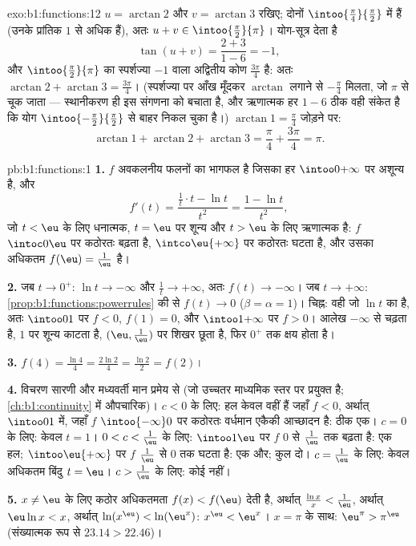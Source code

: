 \begin{solution}{exo:b1:functions:12}
$u = \arctan 2$ और $v = \arctan 3$ रखिए; दोनों
$\intoo{\frac\pi4}{\frac\pi2}$ में हैं (उनके प्रांतिक $1$ से अधिक हैं), अतः
$u + v \in \intoo{\frac\pi2}{\pi}$। योग-सूत्र देता है
\[
\tan(u + v) = \frac{2 + 3}{1 - 6} = -1 ,
\]
और $\intoo{\frac\pi2}{\pi}$ का स्पर्शज्या $-1$ वाला अद्वितीय कोण
$\frac{3\pi}4$ है: अतः $\arctan 2 + \arctan 3 = \frac{3\pi}4$। (स्पर्शज्या
पर आँख मूँदकर $\arctan$ लगाने से $-\frac\pi4$ मिलता, जो $\pi$ से चूक जाता
--- स्थानीकरण ही इस संगणना को बचाता है, और ऋणात्मक हर $1 - 6$ ठीक वही संकेत
है कि योग $\intoo{-\frac\pi2}{\frac\pi2}$ से बाहर निकल चुका है।) $\arctan 1
= \frac\pi4$ जोड़ने पर:
\[
\arctan 1 + \arctan 2 + \arctan 3 = \frac\pi4 + \frac{3\pi}4 = \pi .
\]
\end{solution}

\begin{solution}{pb:b1:functions:1}
\textbf{1.} $f$ अवकलनीय फलनों का भागफल है जिसका हर $\intoo0{+\infty}$ पर
अशून्य है, और
\[
f'(t) = \frac{\frac1t \cdot t - \ln t}{t^2} = \frac{1 - \ln
t}{t^2} ,
\]
जो $t < \eu$ के लिए धनात्मक, $t = \eu$ पर शून्य और $t > \eu$ के लिए ऋणात्मक
है: $f$ $\intoc0\eu$ पर कठोरतः बढ़ता है, $\intco\eu{+\infty}$ पर कठोरतः घटता
है, और उसका अधिकतम $f(\eu) = \frac1\eu$ है।

\textbf{2.} जब $t \to 0^+$: $\ln t \to -\infty$ और $\frac1t \to +\infty$,
अतः $f(t) \to -\infty$। जब $t \to +\infty$:
\cref{prop:b1:functions:powerrules} की  से $f(t) \to 0$ ($\beta
= \alpha = 1$)। चिह्न: वही जो $\ln t$ का है, अतः $\intoo01$ पर $f < 0$,
$f(1) = 0$, और $\intoo1{+\infty}$ पर $f > 0$। आलेख $-\infty$ से चढ़ता है,
$1$ पर शून्य काटता है, $(\eu, \frac1\eu)$ पर शिखर छूता है, फिर $0^+$ तक क्षय
होता है।

\textbf{3.} $f(4) = \frac{\ln 4}4 = \frac{2\ln 2}4 = \frac{\ln 2}2 = f(2)$।

\textbf{4.} विचरण सारणी और मध्यवर्ती मान प्रमेय से (जो उच्चतर माध्यमिक स्तर
पर प्रयुक्त है; \cref{ch:b1:continuity} में औपचारिक)। $c < 0$ के लिए: हल
केवल वहीं हैं जहाँ $f < 0$, अर्थात् $\intoo01$ में, जहाँ $f$
$\intoo{-\infty}0$ पर कठोरतः वर्धमान एकैकी आच्छादन है: ठीक एक। $c = 0$ के
लिए: केवल $t = 1$। $0 < c < \frac1\eu$ के लिए: $\intoo1\eu$ पर $f$ $0$ से
$\frac1\eu$ तक बढ़ता है: एक हल; $\intoo\eu{+\infty}$ पर $f$ $\frac1\eu$ से
$0$ तक घटता है: एक और; कुल दो। $c = \frac1\eu$ के लिए: केवल अधिकतम बिंदु $t
= \eu$। $c > \frac1\eu$ के लिए: कोई नहीं।

\textbf{5.} $x \neq \eu$ के लिए कठोर अधिकतमता $f(x) < f(\eu)$ देती है,
अर्थात् $\frac{\ln x}x < \frac1\eu$, अर्थात् $\eu\ln x < x$, अर्थात्
$\ln(x^\eu) < \ln(\eu^x)$: $x^\eu < \eu^x$। $x = \pi$ के साथ: $\eu^\pi >
\pi^\eu$ (संख्यात्मक रूप से $23.14 > 22.46$)।


\end{solution}
